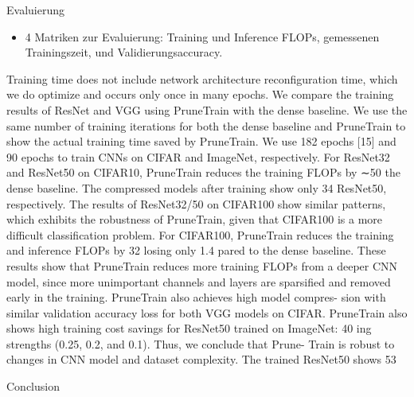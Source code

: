 \documentclass[10pt]{beamer}
\begin{document}
\begin{frame}{Evaluierung}
\begin{itemize}
 \item 4 Matriken zur Evaluierung: Training und Inference FLOPs, gemessenen Trainingszeit, und Validierungsaccuracy. 
\end{itemize}

Training time does not include network architecture reconfiguration time, which we do optimize and occurs only once in many
epochs. We compare the training results of ResNet and VGG using
PruneTrain with the dense baseline. We use the same number of
training iterations for both the dense baseline and PruneTrain to
show the actual training time saved by PruneTrain. We use 182
epochs [15] and 90 epochs to train CNNs on CIFAR and ImageNet,
respectively.
For ResNet32 and ResNet50 on CIFAR10, PruneTrain reduces the
training FLOPs by ∼50%
the dense baseline. The compressed models after training show only
34%
ResNet50, respectively. The results of ResNet32/50 on CIFAR100
show similar patterns, which exhibits the robustness of PruneTrain,
given that CIFAR100 is a more difficult classification problem. For
CIFAR100, PruneTrain reduces the training and inference FLOPs
by 32%
losing only 1.4%
pared to the dense baseline. These results show that PruneTrain
reduces more training FLOPs from a deeper CNN model, since
more unimportant channels and layers are sparsified and removed
early in the training. PruneTrain also achieves high model compres-
sion with similar validation accuracy loss for both VGG models on
CIFAR.
PruneTrain also shows high training cost savings for ResNet50
trained on ImageNet: 40%
ing strengths (0.25, 0.2, and 0.1). Thus, we conclude that Prune-
Train is robust to changes in CNN model and dataset complexity.
The trained ResNet50 shows 53%
\end{frame}


\begin{frame}{Conclusion}
 
\end{frame}
\end{document}
